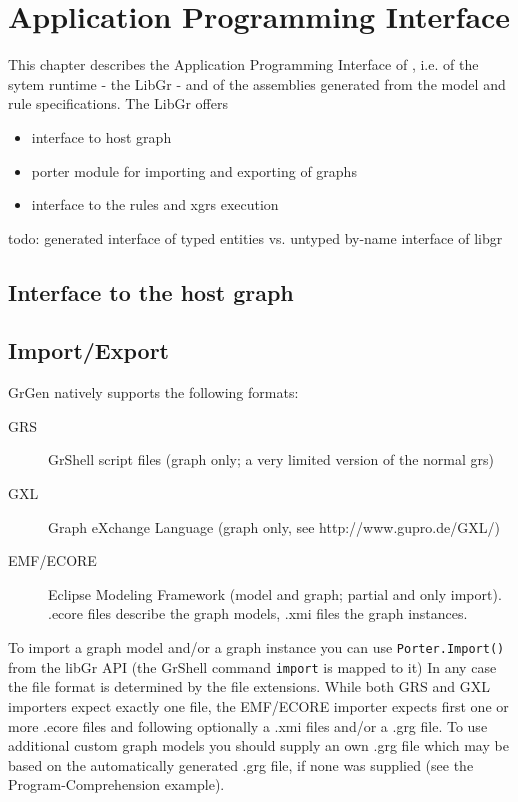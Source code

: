 \chapter{Application Programming Interface}
\label{chapapi}

This chapter describes the Application Programming Interface of \GrG, i.e. of the sytem runtime - the LibGr - and of the assemblies generated from the model and rule specifications.
The LibGr offers
\begin{itemize}
\item interface to host graph
\item porter module for importing and exporting of graphs
\item interface to the rules and xgrs execution
\end{itemize}

todo: generated interface of typed entities vs. untyped by-name interface of libgr

\section{Interface to the host graph}

\section{Import/Export}\label{sub:imexport}

GrGen natively supports the following formats:
\begin{description}
  \item[GRS] GrShell script files (graph only; a very limited version of the normal grs)
  \item[GXL] Graph eXchange Language (graph only, see http://www.gupro.de/GXL/)
  \item[EMF/ECORE] Eclipse Modeling Framework (model and graph; partial and only import).
      .ecore files describe the graph models, .xmi files the graph instances.
\end{description}

To import a graph model and/or a graph instance you can use
\verb#Porter.Import()# from the libGr API (the GrShell command \verb#import# is mapped to it)
In any case the file format is determined by the file extensions.
While both GRS and GXL importers expect exactly one file, the EMF/ECORE importer
expects first one or more .ecore files and following optionally a .xmi files and/or
a .grg file. To use additional custom graph models you should supply an own .grg
file which may be based on the automatically generated .grg file, if none was
supplied (see the Program-Comprehension example).

